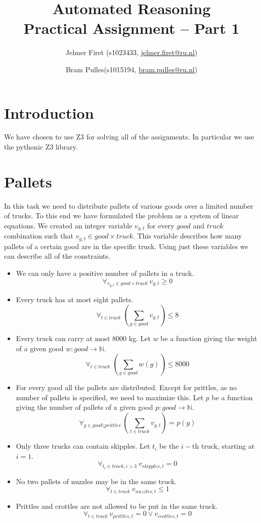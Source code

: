 \documentclass{scrartcl}
\author{Jelmer Firet (s1023433, \href{mailto:jelmer.firet@ru.nl}{jelmer.firet@ru.nl}) \and
Bram Pulles(s1015194, \href{mailto:bram.pulles@ru.nl}{bram.pulles@ru.nl})}
\title{\textbf{Automated Reasoning\\Practical Assignment -- Part 1}}
\begin{document}
\maketitle

\section{Introduction}
We have chosen to use Z3 for solving all of the assignments. In particular we
use the pythonic Z3 library.

\section{Pallets}
In this task we need to distribute pallets of various goods over a limited
number of trucks. To this end we have formulated the problem as a system of
linear equations. We created an integer variable $v_{g,t}$ for every $good$ and
$truck$ combination such that $v_{g,t} \in good \times truck$. This variable
describes how many pallets of a certain good are in the specific truck. Using
just these variables we can describe all of the constraints.

\begin{itemize}
	\item
		We can only have a positive number of pallets in a truck.
		\[ \forall_{v_{g,t} \in good \times truck}\ v_{g,t} \geq 0 \]
	\item
		Every truck has at most eight pallets.
		\[ \forall_{t \in truck}\ \left( \sum_{g \in good} v_{g,t} \right) \leq 8 \]
	\item
		Every truck can carry at most 8000 kg. Let $w$ be a function giving the
		weight of a given good $w: good \to \mathbb{N}$.
		\[ \forall_{t \in truck}\ \left( \sum_{g \in good} w(g) \right) \leq 8000 \]
	\item
		For every good all the pallets are distributed. Except for prittles, as
		no number of pallets is specified, we need to maximize this. Let $p$ be
		a function giving the number of pallets of a given good $p: good \to
		\mathbb{N}$.
		\[
		\forall_{g \in good \setminus prittles}\
		\left( \sum_{t \in truck} v_{g,t} \right) = p(g)
		\]
	\item
		Only three trucks can contain skipples. Let $t_i$ be the $i-$th truck,
		starting at $i = 1$.
		\[ \forall_{t_i \in truck, i > 3 }\ v_{skipples,t} = 0 \]
	\item
		No two pallets of nuzzles may be in the same truck.
		\[ \forall_{t \in truck}\ v_{nuzzles,t} \leq 1 \]
	\item
		Prittles and crottles are not allowed to be put in the same truck.
		\[ \forall_{t \in truck}\ v_{prittles,t} = 0 \lor v_{crottles,t} = 0 \]
\end{itemize}
\end{document}
